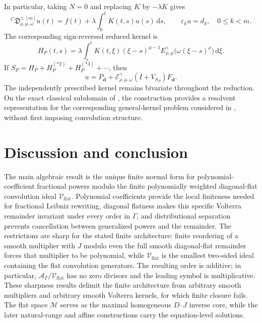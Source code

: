 \documentclass[11pt]{article}
\numberwithin{equation}{section}
\theoremstyle{definition}
\theoremstyle{remark}
\newcommand{\M}{\mathcal M}
\newcommand{\A}{\mathcal A}
\newcommand{\Vflat}{\mathcal V_{\mathrm{flat}}}
\newcommand{\E}{\mathcal E}
\newcommand{\dd}{\,\mathrm d}
\begin{document}
In particular, taking $N=0$ and replacing $K$ by $-\lambda K$ gives
\begin{equation}
{}^C\!\mathfrak D_{\rho,\mu,\omega}^{\gamma,[m]}u(t)
=f(t)+\lambda\int_0^tK(t,s)u(s)\dd s,
\qquad \varepsilon_ku=d_k,\quad 0\le k<m.
\end{equation}
The corresponding sign-reversed reduced kernel is
\begin{equation*}
H_P(t,s)=\lambda\int_s^tK(t,\xi)(\xi-s)^{\mu-1}
E_{\rho,\mu}^{\gamma}\bigl(\omega(\xi-s)^\rho\bigr)\dd\xi.
\end{equation*}
If $S_P=H_P+H_P^{(*2)}+H_P^{(*3)}+\cdots$, then
\begin{equation}
u=P_{\mathbf d}+\E_{\rho,\mu,\omega}^{\gamma}(I+V_{S_P})F_{\mathbf d}.
\end{equation}
The independently prescribed kernel remains bivariate throughout the reduction. On the exact classical subdomain of , the construction provides a resolvent representation for the corresponding general-kernel problem considered in \cite{Eshaghi2021}, without first imposing convolution structure.

\section{Discussion and conclusion}

The main algebraic result is the unique finite normal form for polynomial-coefficient fractional powers modulo the finite polynomially weighted diagonal-flat convolution ideal $\Vflat$. Polynomial coefficients provide the local finiteness needed for fractional Leibniz rewriting, diagonal flatness makes this specific Volterra remainder invariant under every order in $\Gamma$, and distributional separation prevents cancellation between generalized powers and the remainder. The restrictions are sharp for the stated finite architecture: finite reordering of a smooth multiplier with $J$ modulo even the full smooth diagonal-flat remainder forces that multiplier to be polynomial, while $\Vflat$ is the smallest two-sided ideal containing the flat convolution generators. The resulting order is additive; in particular, $\A_\Gamma/\Vflat$ has no zero divisors and the leading symbol is multiplicative. These sharpness results delimit the finite architecture from arbitrary smooth multipliers and arbitrary smooth Volterra kernels, for which finite closure fails. The flat space $\M$ serves as the maximal homogeneous $D$--$J$ inverse core, while the later natural-range and affine constructions carry the equation-level solutions.
\end{document}
